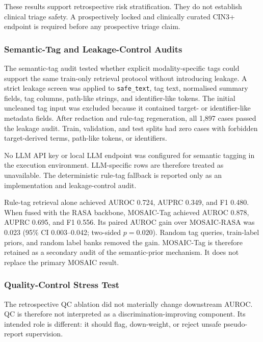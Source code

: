 \documentclass[11pt, a4paper]{article}
\theoremstyle{plain}
\theoremstyle{definition}
\begin{document}
These results support retrospective risk stratification. They do not establish clinical triage safety. A prospectively locked and clinically curated CIN3+ endpoint is required before any prospective triage claim.

\subsubsection{Semantic-Tag and Leakage-Control Audits}
\label{subsec:llm_semantic_tag_results}

The semantic-tag audit tested whether explicit modality-specific tags could support the same train-only retrieval protocol without introducing leakage. A strict leakage screen was applied to \texttt{safe\_text}, tag text, normalised summary fields, tag columns, path-like strings, and identifier-like tokens. The initial uncleaned tag input was excluded because it contained target- or identifier-like metadata fields. After redaction and rule-tag regeneration, all 1,897 cases passed the leakage audit. Train, validation, and test splits had zero cases with forbidden target-derived terms, path-like tokens, or identifiers.

No LLM API key or local LLM endpoint was configured for semantic tagging in the execution environment. LLM-specific rows are therefore treated as unavailable. The deterministic rule-tag fallback is reported only as an implementation and leakage-control audit.

Rule-tag retrieval alone achieved AUROC 0.724, AUPRC 0.349, and F1 0.480. When fused with the RASA backbone, MOSAIC-Tag achieved AUROC 0.878, AUPRC 0.695, and F1 0.556. Its paired AUROC gain over MOSAIC-RASA was 0.023 (95\% CI 0.003--0.042; two-sided \(p=0.020\)). Random tag queries, train-label priors, and random label banks removed the gain. MOSAIC-Tag is therefore retained as a secondary audit of the semantic-prior mechanism. It does not replace the primary MOSAIC result.

\subsubsection{Quality-Control Stress Test}
\label{subsec:qc_stress_results}

The retrospective QC ablation did not materially change downstream AUROC. QC is therefore not interpreted as a discrimination-improving component. Its intended role is different: it should flag, down-weight, or reject unsafe pseudo-report supervision.
\end{document}
